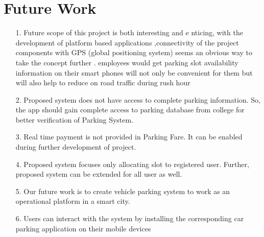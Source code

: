 \documentclass[12pt,a4paper]{report}
\begin{document}
\section{Future Work}
\begin{itemize}
	\item[1.] Future scope of this project is both interesting and e
	nticing, 
	with    the    development    of    platform    based    applications 
	,connectivity  of  the  project  components  with  GPS  (global 
	positioning system) seems an obvious way to take the concept 
	further   .   employees   would   get   parking   slot   availability 
	information on their 
	smart phones will not only be convenient 
	for them but will also help to reduce on road traffic during rush 
	hour      
	\item[2.] Proposed system does not have access to complete parking information. So, the app should gain complete access to parking database from college for better verification of Parking System.
	\item[3.] Real time payment is not provided in Parking Fare. It can be enabled during further development of project.
	\item[4.] Proposed system focuses only allocating slot to registered user. Further, proposed system can be extended for all user as well. 
	\item[5.] Our future work is to create vehicle parking system to work as an operational platform in a smart city.
	\item[6.] Users can interact with the system by installing the corresponding car parking application on their mobile devices

\end{itemize}
\clearpage
\thispagestyle{empty}
\end{document}
